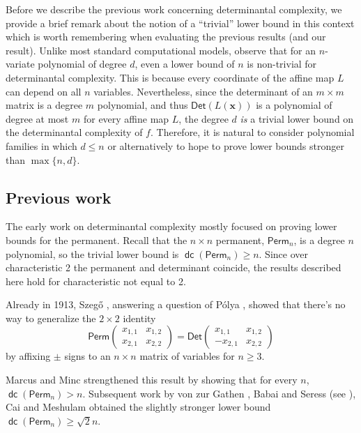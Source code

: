 \documentclass[10pt,a4paper]{article}
\newcommand{\vx}{\mathbf{x}}
\newcommand{\Perm}{\mathsf{Perm}}
\newcommand{\Det}{\mathsf{Det}}
\DeclareMathOperator{\dc}{\mathsf{dc}}
\begin{document}
Before we describe the previous work concerning determinantal complexity, we provide a brief remark about the notion of a ``trivial'' lower bound in this context which is worth remembering when evaluating the previous results (and our result). Unlike most standard computational models, observe that for an $n$-variate polynomial of degree $d$, even a lower bound of $n$ is non-trivial for determinantal complexity. This is because every coordinate of the affine  map $L$ can depend on all $n$ variables. Nevertheless, since the determinant of an $m \times m$ matrix is a degree $m$ polynomial, and thus $\Det(L(\vx))$ is a polynomial of degree at most $m$ for every affine map $L$, the degree $d$ \emph{is} a trivial lower bound on the determinantal complexity of $f$. Therefore, it is natural to consider polynomial families in which $d \le n$ or alternatively to hope to prove lower bounds stronger than $\max\{n,d\}$.

\subsection{Previous work}\label{sec:previous results}

The early work on determinantal complexity mostly focused on proving lower bounds for the permanent. Recall that the $n \times n$ permanent, $\Perm_n$, is a degree $n$ polynomial, so the trivial lower bound is $\dc(\Perm_n) \ge n$. Since over characteristic 2 the permanent and determinant coincide, the results described here hold for characteristic not equal to 2.


Already in 1913, Szeg\H{o} \cite{Szego13}, answering a question of P\'{o}lya \cite{Polya13}, showed that there's no way to generalize the $2 \times 2$ identity
\[
\Perm
\begin{pmatrix}
x_{1,1} & x_{1,2} \\
x_{2,1} & x_{2,2}
\end{pmatrix}
=
\Det
\begin{pmatrix}
x_{1,1} & x_{1,2} \\
-x_{2,1} & x_{2,2}
\end{pmatrix}
\]
by affixing $\pm$ signs to an $n\times n$ matrix of variables for $n \ge 3$.

Marcus and Minc \cite{MM61} strengthened this result by showing that for every $n$, $\dc(\Perm_n) > n$. Subsequent work by von zur Gathen \cite{vzG87}, Babai and Seress (see \cite{vzG87}), Cai \cite{Cai90} and Meshulam \cite{Meshulam} obtained the slightly stronger lower bound $\dc(\Perm_n) \ge \sqrt{2}n$.
\end{document}
